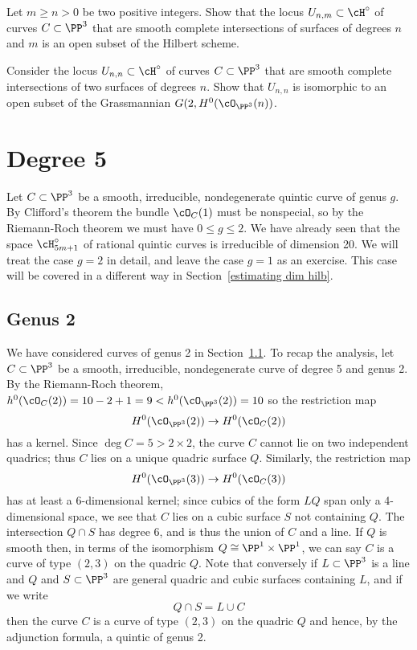\begin{exercise}\label{complete intersection open}
Let $m \geq n >0$ be two positive integers. Show that the locus $U_{n,m} \subset \cH^\circ$ of curves $C \subset \PP^3$ that are smooth complete intersections of surfaces of degrees $n$ and $m$ is an open subset of the Hilbert scheme.
\end{exercise}

\begin{exercise}\label{first complete intersection exercise}
Consider  the locus $U_{n,n} \subset \cH^\circ$ of curves $C \subset \PP^3$ that are smooth complete intersections of two surfaces of degrees $n$. Show that $U_{n,n}$ 
is isomorphic to an open subset of the Grassmannian $G(2, H^0(\cO_{\PP^3}(n))$.
\end{exercise}

\section{Degree 5}

Let $C \subset \PP^3$ be a smooth, irreducible, nondegenerate quintic curve of genus $g$. By Clifford's theorem the bundle $\cO_C(1)$ must be nonspecial, so  by the Riemann-Roch theorem we must have $0\leq g \leq 2$. We have already seen that the space $\cH^\circ_{5m+1}$ of rational quintic curves is irreducible of dimension 20. We will treat the case $g=2$ in detail, and leave the case $g=1$ as an exercise. This case will be covered in a different way in Section~\ref{estimating dim hilb}.

\subsection{Genus 2}

We have considered curves of genus 2 in Section~\ref{}.  To recap the analysis, let $C \subset \PP^3$ be a smooth, irreducible, nondegenerate curve of degree 5 and genus 2. By the Riemann-Roch theorem,  $h^0(\cO_C(2)) = 10-2+1 = 9<h^0(\cO_{\PP^3}(2)) = 10$  so the restriction map
$$
H^0(\cO_{\PP^3}(2)) \to H^0(\cO_C(2))
$$
has a kernel. Since $\deg C = 5 > 2\times 2$, the curve $C$ cannot lie on two independent quadrics; thus $C$ lies on a unique quadric surface $Q$. Similarly, the restriction map
$$
H^0(\cO_{\PP^3}(3)) \to H^0(\cO_C(3))
$$
has at least a 6-dimensional kernel; since cubics of the form $LQ$ span only a 4-dimensional space, we see that $C$ lies on a cubic surface $S$ not containing $Q$. The intersection $Q\cap S$
has degree 6, and is thus the union of $C$ and a line. If $Q$ is smooth then, in terms of the isomorphism $Q \cong \PP^1 \times \PP^1$, we can say $C$ is a curve of type $(2,3)$ on the quadric $Q$. Note that conversely if $L \subset \PP^3$ is a line and $Q$ and $S \subset \PP^3$ are general quadric and cubic surfaces containing $L$, and if we write
$$
Q \cap S = L \cup C
$$ 
then the curve $C$ is a curve of type $(2,3)$ on the quadric $Q$ and hence, by the adjunction formula,
 a quintic of genus 2.

